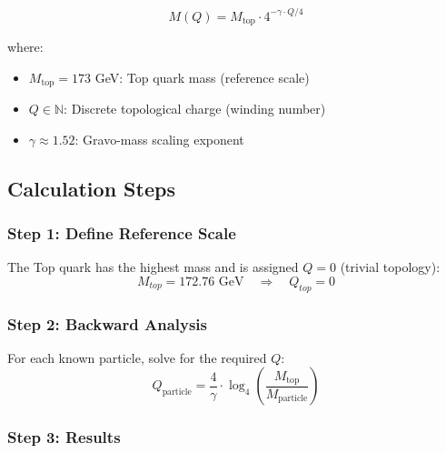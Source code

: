 \documentclass[11pt, a4paper]{article}
\theoremstyle{remark}
\newcommand{\Mtop}{M_{\text{top}}}
\begin{document}
\begin{equation}
\boxed{
M(Q) = \Mtop \cdot 4^{-\gamma \cdot Q/4}
}
\label{eq:mass_formula}
\end{equation}

where:
\begin{itemize}
    \item $\Mtop = 173$ GeV: Top quark mass (reference scale)
    \item $Q \in \mathbb{N}$: Discrete topological charge (winding number)
    \item $\gamma \approx 1.52$: Gravo-mass scaling exponent
\end{itemize}

\subsection{Calculation Steps}

\subsubsection{Step 1: Define Reference Scale}

The Top quark has the highest mass and is assigned $Q = 0$ (trivial topology):
\begin{equation}
M_{top} = 172.76 \text{ GeV} \quad \Rightarrow \quad Q_{top} = 0
\end{equation}

\subsubsection{Step 2: Backward Analysis}

For each known particle, solve for the required $Q$:
\begin{equation}
Q_{\text{particle}} = \frac{4}{\gamma} \cdot \log_4\left(\frac{\Mtop}{M_{\text{particle}}}\right)
\end{equation}

\subsubsection{Step 3: Results}
\end{document}
